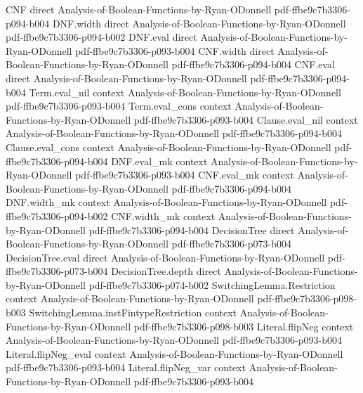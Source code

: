 \begin{theorem}
\proofstep
  {CNF}
  {direct}
  {Analysis-of-Boolean-Functions-by-Ryan-ODonnell}
  {pdf-ffbe9c7b3306-p094-b004}
\proofstep
  {DNF.width}
  {direct}
  {Analysis-of-Boolean-Functions-by-Ryan-ODonnell}
  {pdf-ffbe9c7b3306-p094-b002}
\proofstep
  {DNF.eval}
  {direct}
  {Analysis-of-Boolean-Functions-by-Ryan-ODonnell}
  {pdf-ffbe9c7b3306-p093-b004}
\proofstep
  {CNF.width}
  {direct}
  {Analysis-of-Boolean-Functions-by-Ryan-ODonnell}
  {pdf-ffbe9c7b3306-p094-b004}
\proofstep
  {CNF.eval}
  {direct}
  {Analysis-of-Boolean-Functions-by-Ryan-ODonnell}
  {pdf-ffbe9c7b3306-p094-b004}
\proofstep
  {Term.eval_nil}
  {context}
  {Analysis-of-Boolean-Functions-by-Ryan-ODonnell}
  {pdf-ffbe9c7b3306-p093-b004}
\proofstep
  {Term.eval_cons}
  {context}
  {Analysis-of-Boolean-Functions-by-Ryan-ODonnell}
  {pdf-ffbe9c7b3306-p093-b004}
\proofstep
  {Clause.eval_nil}
  {context}
  {Analysis-of-Boolean-Functions-by-Ryan-ODonnell}
  {pdf-ffbe9c7b3306-p094-b004}
\proofstep
  {Clause.eval_cons}
  {context}
  {Analysis-of-Boolean-Functions-by-Ryan-ODonnell}
  {pdf-ffbe9c7b3306-p094-b004}
\proofstep
  {DNF.eval_mk}
  {context}
  {Analysis-of-Boolean-Functions-by-Ryan-ODonnell}
  {pdf-ffbe9c7b3306-p093-b004}
\proofstep
  {CNF.eval_mk}
  {context}
  {Analysis-of-Boolean-Functions-by-Ryan-ODonnell}
  {pdf-ffbe9c7b3306-p094-b004}
\proofstep
  {DNF.width_mk}
  {context}
  {Analysis-of-Boolean-Functions-by-Ryan-ODonnell}
  {pdf-ffbe9c7b3306-p094-b002}
\proofstep
  {CNF.width_mk}
  {context}
  {Analysis-of-Boolean-Functions-by-Ryan-ODonnell}
  {pdf-ffbe9c7b3306-p094-b004}
\proofstep
  {DecisionTree}
  {direct}
  {Analysis-of-Boolean-Functions-by-Ryan-ODonnell}
  {pdf-ffbe9c7b3306-p073-b004}
\proofstep
  {DecisionTree.eval}
  {direct}
  {Analysis-of-Boolean-Functions-by-Ryan-ODonnell}
  {pdf-ffbe9c7b3306-p073-b004}
\proofstep
  {DecisionTree.depth}
  {direct}
  {Analysis-of-Boolean-Functions-by-Ryan-ODonnell}
  {pdf-ffbe9c7b3306-p074-b002}
\proofstep
  {SwitchingLemma.Restriction}
  {context}
  {Analysis-of-Boolean-Functions-by-Ryan-ODonnell}
  {pdf-ffbe9c7b3306-p098-b003}
\proofstep
  {SwitchingLemma.instFintypeRestriction}
  {context}
  {Analysis-of-Boolean-Functions-by-Ryan-ODonnell}
  {pdf-ffbe9c7b3306-p098-b003}
\proofstep
  {Literal.flipNeg}
  {context}
  {Analysis-of-Boolean-Functions-by-Ryan-ODonnell}
  {pdf-ffbe9c7b3306-p093-b004}
\proofstep
  {Literal.flipNeg_eval}
  {context}
  {Analysis-of-Boolean-Functions-by-Ryan-ODonnell}
  {pdf-ffbe9c7b3306-p093-b004}
\proofstep
  {Literal.flipNeg_var}
  {context}
  {Analysis-of-Boolean-Functions-by-Ryan-ODonnell}
  {pdf-ffbe9c7b3306-p093-b004}

\end{theorem}
